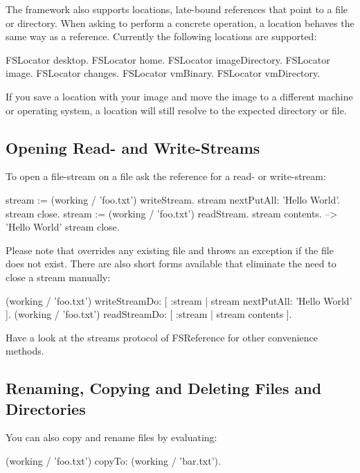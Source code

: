 \documentclass[a4paper,10pt,twoside]{book}
\begin{document}
The framework also supports locations, late-bound references that point to a file or directory. When asking to perform a concrete operation, a location behaves the same way as a reference. Currently the following locations are supported:

\begin{code}{}
 FSLocator desktop.
 FSLocator home.
 FSLocator imageDirectory.
 FSLocator image.
 FSLocator changes.
 FSLocator vmBinary.
 FSLocator vmDirectory.
\end{code} 

If you save a location with your image and move the image to a different machine or operating system, a location will still resolve to the expected directory or file.

\subsection{Opening Read- and Write-Streams}

To open a file-stream on a file ask the reference for a read- or write-stream:

\begin{code}{}
 stream := (working / 'foo.txt') writeStream.
 stream nextPutAll: 'Hello World'.
 stream close.
 stream := (working / 'foo.txt') readStream.
 stream contents.			--> 'Hello World'
 stream close.
\end{code}

Please note that  overrides any existing file and  throws an exception if the file does not exist. There are also short forms available that eliminate the need to close a stream manually:

\begin{code}{}
 (working / 'foo.txt') writeStreamDo: [ :stream | stream nextPutAll: 'Hello World' ].
 (working / 'foo.txt') readStreamDo: [ :stream | stream contents ].
\end{code}

Have a look at the streams protocol of FSReference for other convenience methods.

\subsection{Renaming, Copying and Deleting Files and Directories}

You can also copy and rename files by evaluating:

\begin{code}{}
 (working / 'foo.txt') copyTo: (working / 'bar.txt').
\end{code} 
\end{document}
